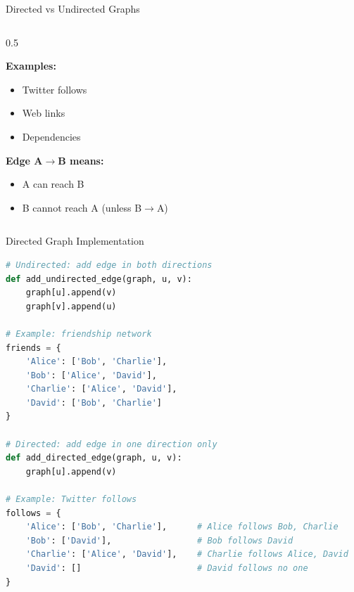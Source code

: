 \documentclass[aspectratio=169]{beamer}
\begin{document}
\begin{frame}{Directed vs Undirected Graphs}
\begin{columns}[T]
\begin{column}{0.5\textwidth}
\begin{center}
      \end{center}

      \textbf{Examples:}
      \begin{itemize}
        \item Twitter follows
        \item Web links
        \item Dependencies
      \end{itemize}

      \textbf{Edge A$\rightarrow$B means:}
      \begin{itemize}
        \item A can reach B
        \item B cannot reach A (unless B$\rightarrow$A)
      \end{itemize}
    \end{column}
  \end{columns}
\end{frame}

\begin{frame}[fragile]{Directed Graph Implementation}
  \begin{lstlisting}[language=Python, basicstyle=\ttfamily\small]
# Undirected: add edge in both directions
def add_undirected_edge(graph, u, v):
    graph[u].append(v)
    graph[v].append(u)

# Example: friendship network
friends = {
    'Alice': ['Bob', 'Charlie'],
    'Bob': ['Alice', 'David'],
    'Charlie': ['Alice', 'David'],
    'David': ['Bob', 'Charlie']
}

# Directed: add edge in one direction only
def add_directed_edge(graph, u, v):
    graph[u].append(v)

# Example: Twitter follows
follows = {
    'Alice': ['Bob', 'Charlie'],      # Alice follows Bob, Charlie
    'Bob': ['David'],                 # Bob follows David
    'Charlie': ['Alice', 'David'],    # Charlie follows Alice, David
    'David': []                       # David follows no one
}
  \end{lstlisting}
\end{frame}
\end{document}
